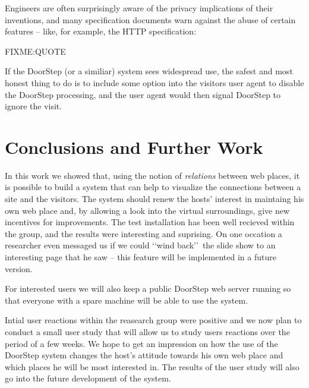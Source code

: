 \documentclass[a4paper]{danarticle}
\theoremstyle{remark}
\begin{document}
{    Engineers are often surprisingly aware of the privacy implications of their 
    inventions, and many specification documents warn against the abuse of 
    certain features -- like, for example, the HTTP specification\cite{http}:
    
    FIXME:QUOTE
    
    If the DoorStep (or a similiar) system sees widespread use, the safest and 
    most honest thing to do is to include some option into the visitors user 
    agent to disable the DoorStep processing, and the user agent would then 
    signal DoorStep to ignore the visit.
  \section{Conclusions and Further Work} In this work we showed that, using 
    the notion of \textit{relations} between web places, it is possible to build 
    a system that can help to visualize the connections between a site and the 
    visitors. The system should renew the hosts' interest in maintaing his own 
    web place and, by allowing a look into the virtual surroundings, give new 
    incentives for improvements. The test installation has been well recieved 
    within the group, and the results were interesting and suprising. On one 
    occation a researcher even messaged us if we could \lq\lq wind back\rq\rq\ 
    the slide show to an interesting page that he saw -- this feature will be 
    implemented in a future version.
    
    For interested users we will also keep a public DoorStep web server running
    so that everyone with a spare machine will be able to use the system.
    
    Intial user reactions within the reasearch group were positive and we now
    plan to conduct a small user study that will allow us to study users
    reactions over the period of a few weeks. We hope to get an impression on how
    the use of the DoorStep system changes the host's attitude towards his own
    web place and which places he will be most interested in. The results of the
    user study will also go into the future development of the system.
    
}
\end{document}
